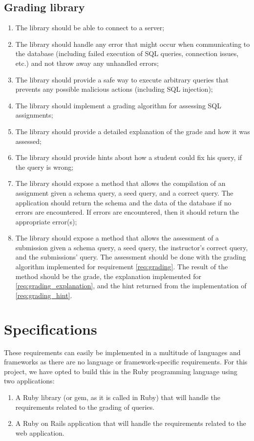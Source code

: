 \subsection{Grading library}
\begin{enumerate}[label=G-\arabic*]
  \item The library should be able to connect to a  server;
  \item The library should handle any error that might occur when communicating to the database (including failed execution of SQL queries, connection issues, etc.) and not throw away any unhandled errors;
  \item The library should provide a safe way to execute arbitrary queries that prevents any possible malicious actions (including SQL injection);
  \item The library should implement a grading algorithm for assessing SQL assignments; \label{req:grading}
  \item The library should provide a detailed explanation of the grade and how it was assessed; \label{req:grading_explanation}
  \item The library should provide hints about how a student could fix his query, if the query is wrong; \label{req:grading_hint}
  \item The library should expose a method that allows the compilation of an assignment given a schema query, a seed query, and a correct query. The application should return the schema and the data of the database if no errors are encountered. If errors are encountered, then it should return the appropriate error(s);
  \item The library should expose a method that allows the assessment of a submission given a schema query, a seed query, the instructor's correct query, and the submissions' query.  The assessment should be done with the grading algorithm implemented for requirement \ref{req:grading}. The result of the method should be the grade, the explanation implemented for \ref{req:grading_explanation}, and the hint returned from the implementation of \ref{req:grading_hint}.
\end{enumerate}

\section{Specifications} \label{ch:reqandspec:sec:spec}

These requirements can easily be implemented in a multitude of languages and frameworks as there are no language or framework-specific requirements. For this project, we have opted to build this in the Ruby programming language using two applications:
\begin{enumerate}
    \item A Ruby library (or gem, as it is called in Ruby) that will handle the requirements related to the grading of queries.
    \item A Ruby on Rails application that will handle the requirements related to the web application.
\end{enumerate}

